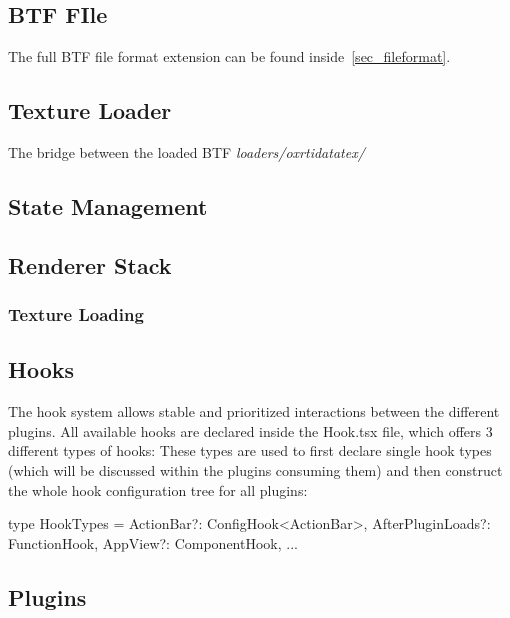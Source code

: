 \subsection{BTF FIle}\label{sec_btffile}
The full BTF file format extension can be found inside~\autoref{sec_fileformat}.

\subsection{Texture Loader}\label{seq_textureloader}
The bridge between the loaded BTF \emph{loaders/oxrtidatatex/}


\subsection{State Management}\label{sec_state}


\subsection{Renderer Stack}\label{sec_rendererstack}
\subsubsection{Texture Loading}\label{sec_textureloading}


\subsection{Hooks}\label{sec_hooks}
The hook system allows stable and prioritized interactions between the different
plugins. All available hooks are declared inside the {Hook.tsx} file, which
offers 3 different types of hooks:
These types are used to first declare single hook types (which will be discussed
within the plugins consuming them) and then construct the whole hook
configuration tree for all plugins:
\begin{typescript}
type HookTypes = {
  ActionBar?: ConfigHook<ActionBar>,
  AfterPluginLoads?: FunctionHook,
  AppView?: ComponentHook,
...
}
\end{typescript}


\subsection{Plugins}\label{sec_plugins}

